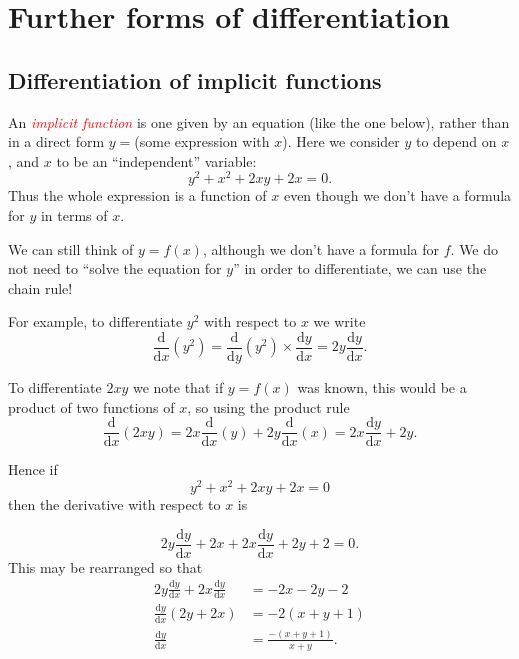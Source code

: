 \documentclass[
  11pt,
  oneside]{book}
\newcommand{\slide}{}
\theoremstyle{definition}
\theoremstyle{definition}
\theoremstyle{definition}
\theoremstyle{definition}
\theoremstyle{remark}
\begin{document}
\section{Further forms of differentiation}\label{further-forms-of-differentiation}

\subsection{Differentiation of implicit functions}\label{differentiation-of-implicit-functions}

An \textcolor{red}{\em implicit function} is one given by an equation (like the one below), rather than in a direct form \(y=\)(some expression with \(x\)). Here we consider \(y\) to depend on \(x\), and \(x\) to be an ``independent'' variable:
\[
y^2 + x^2 + 2xy + 2x = 0.
\]
Thus the whole expression is a function of \(x\) even though we don't have a formula for \(y\) in terms of \(x\).

We can still think of \(y=f(x)\), although we don't have a formula for \(f\). We do not need to ``solve the equation for \(y\)'' in order to differentiate, we can use the chain rule!

\slide

For example, to differentiate \(y^2\) with respect to \(x\) we write
\[
\frac{\mathrm{d}}{\mathrm{d} x}(y^2) = \frac{\mathrm{d}}{\mathrm{d} y}(y^2)\times\frac{\mathrm{d} y}{\mathrm{d} x}= 2y\frac{\mathrm{d} y}{\mathrm{d} x}.
\]
\slide
To differentiate \(2xy\) we note that if \(y=f(x)\) was known, this would be a product of two functions of \(x\), so using the product rule
\[
\frac{\mathrm{d}}{\mathrm{d} x}(2xy) = 2x\frac{\mathrm{d}}{\mathrm{d} x}(y)+2y\frac{\mathrm{d}}{\mathrm{d} x}(x) = 2x\frac{\mathrm{d} y}{\mathrm{d} x} + 2y.
\]
\slide
Hence if
\[
y^2 + x^2 + 2xy + 2x = 0
\]
then the derivative with respect to \(x\) is

\begin{notslides}

\[
2y\frac{\mathrm{d} y}{\mathrm{d} x} + 2x+2x\frac{\mathrm{d} y}{\mathrm{d} x} +2y+2 = 0.
\]
This may be rearranged so that
\begin{align*}
2y\frac{\mathrm{d} y}{\mathrm{d} x}+2x\frac{\mathrm{d} y}{\mathrm{d} x} &= -2x-2y-2\\
\frac{\mathrm{d} y}{\mathrm{d} x}(2y+2x) &= -2(x+y+1)\\
\frac{\mathrm{d} y}{\mathrm{d} x} &= \frac{-(x+y+1)}{x+y}.
\end{align*}

\end{notslides}
\end{document}
